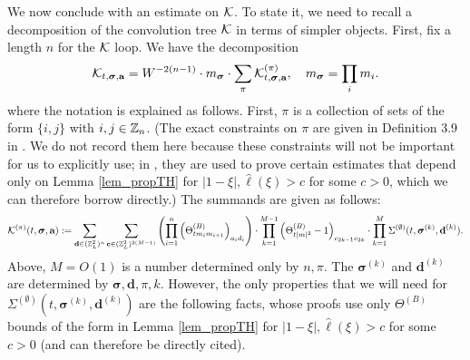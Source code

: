 We now conclude with an estimate on ${\cal K}$. To state it, we need to recall a decomposition of the convolution tree ${\cal K}$ in terms of simpler objects. First, fix a length $n$ for the ${\cal K}$ loop. We have the decomposition
\begin{equation}\label{KKpi}
  {\cal K}_{t, \boldsymbol{\sigma}, \textbf{a}} =W^{-2(n-1)}\cdot m_{\boldsymbol{\sigma}}\cdot \sum_{\pi}{\cal K}_{t, \boldsymbol{\sigma}, \textbf{a}} ^{(\pi)},\quad m_{\boldsymbol{\sigma}}=\prod_i m_i. 
\end{equation}
where the notation is explained as follows. First, $\pi$ is a collection of sets of the form $\{i,j\}$ with $i,j\in\mathbb{Z}_{n}$. (The exact constraints on $\pi$ are given in Definition 3.9 in \cite{YY_25}. We do not record them here because these constraints will not be important for us to explicitly use; in \cite{YY_25}, they are used to prove certain estimates that depend only on Lemma \ref{lem_propTH} for $|1-\xi|,\hat{\ell}(\xi)>c$ for some $c>0$, which we can therefore borrow directly.) The summands are given as follows:
%
\begin{align}
{\cal K}^{(\pi)}(t,\boldsymbol{\sigma},\textbf{a}):=\sum_{\textbf{d}\in(\mathbb{Z}_{L}^{2})^{n}}\sum_{\textbf{c}\in(\mathbb{Z}_{L}^{2})^{2(M-1)}}\left(\prod_{i=1}^{n}\left(\Theta^{(B)}_{tm_{i}m_{i+1}}\right)_{a_{i}d_{i}}\right)\cdot\prod_{k=1}^{M-1}\left(\Theta^{(B)}_{t|m|^{2}}-1\right)_{c_{2k-1}c_{2k}}\cdot\prod_{k=1}^{M}\Sigma^{(\emptyset)}(t,\boldsymbol{\sigma}^{(k)},\textbf{d}^{(k)}).
\end{align}
%
Above, $M=O(1)$ is a number determined only by $n,\pi$. The $\boldsymbol{\sigma}^{(k)}$ and $\textbf{d}^{(k)}$ are determined by $\boldsymbol{\sigma},\textbf{d},\pi,k$. However, the only properties that we will need for $\Sigma^{(\emptyset)}(t,\boldsymbol{\sigma}^{(k)},\textbf{d}^{(k)})$ are the following facts, whose proofs use only $\Theta^{(B)}$ bounds of the form in Lemma \ref{lem_propTH} for $|1-\xi|,\hat{\ell}(\xi)>c$ for some $c>0$ (and can therefore be directly cited).
